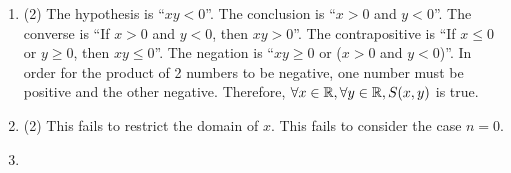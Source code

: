 \documentclass[../MATH135.tex]{subfiles}
\begin{document}
		\begin{enumerate}
			\item
				\begin{tasks}(2)
					\task
						The hypothesis is \enquote{\(xy < 0\)}.
					\task
						The conclusion is \enquote{\(x > 0\) and \(y < 0\)}.
					\task
						The converse is \enquote{If \(x > 0\) and \(y < 0\), then \(xy > 0\)}.
					\task
						The contrapositive is \enquote{If \(x \le 0\) or \(y \ge 0\), then \(xy \le 0\)}.
					\task
						The negation is \enquote{\(xy \ge 0\) or (\(x > 0\) and \(y < 0\))}.
					\task
						In order for the product of 2 numbers to be negative, one number must be positive and the other negative. Therefore, \(\forall x \in \mathbb{R}, \forall y \in \mathbb{R}, S(x, y)\) is true.
				\end{tasks}
			\item
				\begin{tasks}(2)
					\task
						This fails to restrict the domain of \(x\).
					\task
						This fails to consider the case \(n = 0\).
				\end{tasks}
			\item
				\begin{tasks}
					\task
				\end{tasks}
		\end{enumerate}
\end{document}
